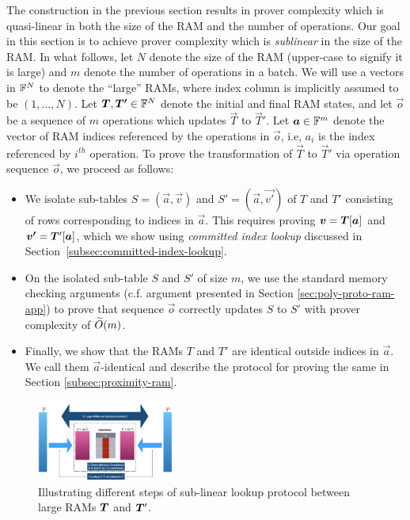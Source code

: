 
The construction in the previous section results in prover complexity which is quasi-linear in both the
size of the RAM and the number of operations.
Our goal in this section is to achieve prover complexity which is {\em sublinear} in the size of the RAM.
In what follows, let $N$ denote the size of the RAM (upper-case to signify it is large) and $m$ denote the number
of operations in a batch. We will use a vectors in $\mathbb{F}^N$ to denote the ``large'' RAMs, where index column is implicitly
assumed to be $(1,\ldots,N)$.
Let $\vec{T},\vec{T'}\in \F^N$ denote the initial and final RAM states, and let $\vec{o}$ be
a sequence of $m$ operations which updates $\vec{T}$ to $\vec{T}'$. Let $\vec{a}\in \F^m$ denote the vector
of RAM indices referenced by the operations in $\vec{o}$, i.e, $a_i$ is the index referenced by $i^{th}$ operation.
To prove the transformation of $\vec{T}$ to $\vec{T}'$ via operation sequence $\vec{o}$, we proceed as follows:
\begin{itemize}[leftmargin=2em, label=-]
    \item We isolate sub-tables $S=(\vec{a},\vec{v})$ and $S'=(\vec{a},\vec{v'})$ of $T$ and $T'$ consisting of
    rows corresponding to indices in $\vec{a}$. This requires proving $\vec{v}=\vecT[\vec{a}]$ and $\vec{v'}=
    \vecT'[\vec{a}]$, which we show using {\em committed index lookup} discussed in Section~\ref{subsec:committed-index-lookup}.

    \item On the isolated sub-table $S$ and $S'$ of size $m$, we use the standard memory checking arguments (c.f. argument
    presented in Section \ref{sec:poly-proto-ram-app}) to prove that sequence $\vec{o}$ correctly updates $S$ to $S'$ with
    prover complexity of $\widetilde{O}(m)$.

    \item Finally, we show that the RAMs $T$ and $T'$ are identical outside indices in $\vec{a}$. We call them $\vec{a}$-identical
    and describe the protocol for proving the same in Section \ref{subsec:proximity-ram}.
\end{itemize}

\begin{figure}[htbp]
    \centering
    \includegraphics[width=0.4\textwidth]{RAM-Lookup}
    \caption{Illustrating different steps of sub-linear lookup protocol between large RAMs $\vecT$ and $\vecT'$.}
    \label{fig:blueprint}
\end{figure}

